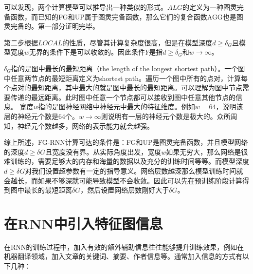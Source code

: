 可以发现，两个计算模型可以推导出一种类似的形式。$ALG$的定义为一种图灵完备函数，而已知的FG和UP属于图灵完备函数，那么它们的复合函数AGG也是图灵完备的。第一部分证明完毕。

第二步根据$LOCAL$的性质，尽管其计算复杂度很高，但是在模型深度$d\geq \delta_G$且模型宽度$w$无界的条件下是可以收敛的。因此条件$Y$是指$d\geq \delta_G$和$w \rightarrow \infty$。

$\delta_G$指的是图中最长的最短距离（the length of the longest shortest path）。一个图中任意两节点的最短距离定义为shortest path。遍历一个图中所有的点对，计算每个点对的最短距离，其中最大的就是图中最长的最短距离。可以理解为图中节点需要传递的最远距离。此时图中任意一个节点都可以接收到图中任意其他节点的信息。 宽度$w$指的是图神经网络中神经元中最大的特征维度。例如$w=64$，说明该层的神经元个数是64个。$w \rightarrow \infty$则说明有一层的神经元个数是极大的。众所周知，神经元个数越多，网络的表示能力就会越强。
 
 
 综上所述，FG-RNN计算可达的条件是：FG和UP是图灵完备函数，并且模型网络的深度$d\geq \delta G$且宽度没有界。​从实际角度出发，宽度$w$如果无穷大，那么网络是很难训练的，需要足够大的内存和海量的数据以及充分的训练时间等等。而模型深度$d\geq \delta G$对我们设置超参数有一定的指导意义。网络层数越深那么模型训练时间就会越长，而如果不够深就可能导致模型不会收敛。因此可以先在预训练阶段计算得到图中最长的最短距离$\delta G$，然后设置网络层数刚好大于$\delta G$。
 
 


\section{在RNN中引入特征图信息}
在RNN的训练过程中，加入有效的额外辅助信息往往能够提升训练效果，例如在机器翻译领域，加入文章的关键词、摘要、作者信息等。通常加入信息的方式有以下几种：

